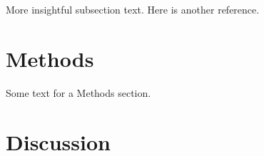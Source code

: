 \documentclass[longbibliography, 12pt]{article}
\begin{document}
 More insightful subsection text. Here is another reference.\cite{Hecht2002}
 
\newpage	
\section{Methods}

Some text for a Methods section. 		

\newpage	
\section{Discussion}



\newpage

\newpage
{}
	
	
\end{document}
